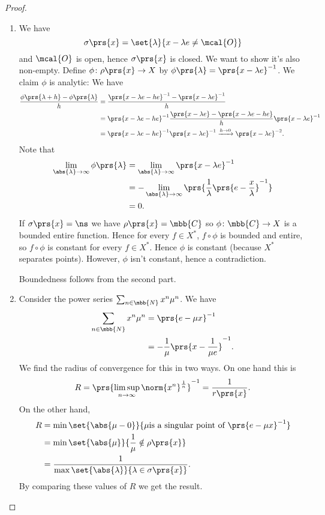 \documentclass[10pt, twoside]{book}
\begin{document}
\begin{proof}
\begin{enumerate}
\item We have
\[\sigma\prs{x} = \set{\lambda}{x - \lambda e \neq \mcal{O}}\]
and $\mcal{O}$ is open, hence $\sigma\prs{x}$ is closed. We want to show it's also non-empty.
Define $\phi \colon \rho\prs{x} \to X$ by $\phi\prs{\lambda} = \prs{x- \lambda e}^{-1}$.
We claim $\phi$ is analytic:
We have
\begin{align*}
\frac{\phi\prs{\lambda + h} - \phi\prs{\lambda}}{h} &= \frac{\prs{x - \lambda e - he}^{-1} - \prs{x - \lambda e}^{-1}}{h}
\\&=
\prs{x-\lambda e - he}^{-1} \frac{\prs{x-\lambda e} - \prs{x-\lambda e - he}}{h} \prs{x-\lambda e}^{-1}
\\&= \prs{x-\lambda e - he}^{-1} \prs{x-\lambda e}^{-1} \xrightarrow{h\to 0} \prs{x-\lambda e}^{-2} \text{.}
\end{align*}
Note that
\begin{align*}
\lim_{\abs{\lambda} \to \infty} \phi\prs{\lambda}
&= \lim_{\abs{\lambda} \to \infty} \prs{x - \lambda e}^{-1}
\\&= - \lim_{\abs{\lambda} \to \infty} \prs{\frac{1}{\lambda} \prs{e - \frac{x}{\lambda}}^{-1}}
\\&= 0 \text{.}
\end{align*}
If $\sigma\prs{x} = \ns$ we have $\rho\prs{x} = \mbb{C}$ so $\phi \colon \mbb{C} \to X$ is a bounded entire function. Hence for every $f \in X^*$, $f \circ \phi$ is bounded and entire, so $f \circ \phi$ is constant for every $f \in X^*$. Hence $\phi$ is constant (because $X^*$ separates points).
However, $\phi$ isn't constant, hence a contradiction.

Boundedness follows from the second part.

\item 
Consider the power series $\sum_{n \in \mbb{N}} x^n \mu^n$. We have
\begin{align*}
\sum_{n \in \mbb{N}} x^n \mu^n &= \prs{e - \mu x}^{-1}
\\&= -\frac{1}{\mu}\prs{x - \frac{1}{\mu e}}^{-1} \text{.}
\end{align*}
We find the radius of convergence for this in two ways. On one hand this is \[R = \prs{\limsup_{n\to\infty} \norm{x^n}^{\frac{1}{n}}}^{-1} = \frac{1}{r\prs{x}} \text{.}\]
On the other hand,
\begin{align*}
R &= \min\set{\abs{\mu - 0}}{\mu \text{is a singular point of } \prs{e-\mu x}^{-1}} 
\\&=
\min \set{\abs{\mu}}{\frac{1}{\mu} \notin \rho\prs{x}}
\\&= \frac{1}{\max\set{\abs{\lambda}}{\lambda \in \sigma\prs{x}}}\text{.}
\end{align*}
By comparing these values of $R$ we get the result.
\end{enumerate}
\end{proof}
\end{document}
